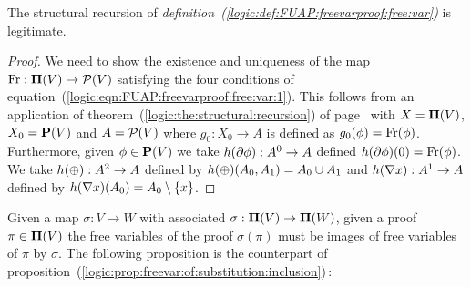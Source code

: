 \begin{prop}\label{logic:prop:FUAP:freevarproof:recursion}
The structural recursion of {\em
definition~(\ref{logic:def:FUAP:freevarproof:free:var})} is
legitimate.
\end{prop}
\begin{proof}
We need to show the existence and uniqueness of the map
$\mbox{\rm Fr}:\mbox{${\bf\Pi}(V)$}\to{\cal P}(V)$ satisfying the four conditions of
equation~(\ref{logic:eqn:FUAP:freevarproof:free:var:1}). This
follows from an application of
theorem~(\ref{logic:the:structural:recursion}) of
page~\pageref{logic:the:structural:recursion} with $X=\mbox{${\bf\Pi}(V)$}$,
$X_{0}=\mbox{${\bf P}(V)$}$ and $A={\cal P}(V)$ where $g_{0}:X_{0}\to A$ is defined
as $g_{0}(\phi)=\mbox{\rm Fr}(\phi)$. Furthermore, given $\phi\in\mbox{${\bf P}(V)$}$ we
take $h(\mbox{$\partial$}\phi):A^{0}\to A$ defined $h(\mbox{$\partial$}\phi)(0)=\mbox{\rm Fr}(\phi)$.
We take $h(\mbox{$\oplus$}):A^{2}\to A$ defined by
$h(\mbox{$\oplus$})(A_{0},A_{1})=A_{0}\cup A_{1}$ and $h(\mbox{$\nabla$} x):A^{1}\to A$
defined by $h(\mbox{$\nabla$} x)(A_{0})=A_{0}\setminus\{x\}$.
\end{proof}

Given a map $\sigma:V\to W$ with associated
$\sigma:\mbox{${\bf\Pi}(V)$}\to{\bf\Pi}(W)$, given a proof $\pi\in\mbox{${\bf\Pi}(V)$}$ the free
variables of the proof $\sigma(\pi)$ must be images of free
variables of $\pi$ by $\sigma$. The following proposition is the
counterpart of
proposition~(\ref{logic:prop:freevar:of:substitution:inclusion})\,:

